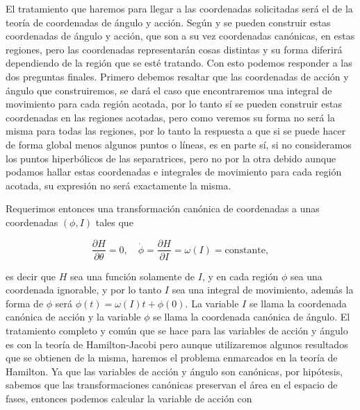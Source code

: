\documentclass[a4paper,10pt]{article}
\numberwithin{equation}{section}
\begin{document}
\vspace{.3cm}

El tratamiento que haremos para llegar a las coordenadas solicitadas será el de 
la teoría de coordenadas de ángulo y acción. Según \cite{arnold} y \cite{calkin} 
se pueden construir estas coordenadas de ángulo y acción, que son a su vez coordenadas 
canónicas, en estas regiones, pero las coordenadas representarán cosas distintas y 
su forma diferirá dependiendo de la región que se esté tratando. Con esto podemos 
responder a las dos preguntas finales. Primero debemos resaltar que las coordenadas 
de acción y ángulo que construiremos, se dará el caso que encontraremos una integral 
de movimiento para cada región acotada, por lo tanto sí se pueden construir estas coordenadas 
en las regiones acotadas, pero como veremos su forma no será la misma para todas las 
regiones, por lo tanto la respuesta a que si se puede hacer de forma global menos 
algunos puntos o líneas, es en parte sí, si no consideramos los puntos hiperbólicos 
de las separatrices, pero no por la otra debido aunque podamos hallar estas coordenadas 
e integrales de movimiento para cada región acotada, su expresión no será exactamente 
la misma.

\vspace{.3cm}

Requerimos entonces una transformación canónica de coordenadas a unas coordenadas 
$(\phi,I)$ tales que 

\begin{equation}
 \frac{\partial H}{\partial \theta} = 0, \quad \dot{\phi} = \frac{\partial H}{\partial I} = 
 \omega (I) = \text{constante},
\end{equation}

es decir que $H$ sea una función solamente de $I$, y en cada región $\phi$ sea una 
coordenada ignorable, y por lo tanto $I$ sea una integral de movimiento, además 
la forma de $\phi$ será $\phi(t) = \omega(I)t + \phi(0)$. La variable $I$ se llama 
la coordenada canónica de acción y la variable $\phi$ se llama la coordenada canónica 
de ángulo. El tratamiento completo y común que se hace para las variables de 
acción y ángulo es con la teoría de Hamilton-Jacobi pero aunque utilizaremos algunos 
resultados que se obtienen de la misma, haremos el problema enmarcados en la teoría 
de Hamilton. Ya que las variables de acción y ángulo son canónicas, por hipótesis, sabemos 
que las transformaciones canónicas preservan el área en el espacio de fases, entonces 
podemos calcular la variable de acción con 
\end{document}

